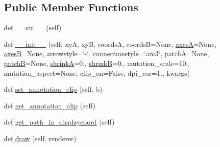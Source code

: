 \subsection*{Public Member Functions}
\begin{DoxyCompactItemize}
\item 
def \hyperlink{classmatplotlib_1_1patches_1_1ConnectionPatch_a54f8ca8cd2c025488440c8a673471175}{\+\_\+\+\_\+str\+\_\+\+\_\+} (self)
\item 
def \hyperlink{classmatplotlib_1_1patches_1_1ConnectionPatch_a6f4e5dce65fbbb4796e7a4d33cdf638d}{\+\_\+\+\_\+init\+\_\+\+\_\+} (self, xyA, xyB, coordsA, coordsB=None, \hyperlink{classmatplotlib_1_1patches_1_1ConnectionPatch_a5943bba0396030581a92ed5f92fcf5ff}{axesA}=None, \hyperlink{classmatplotlib_1_1patches_1_1ConnectionPatch_a7c33301ad97b65e7bdc1cad339ff071f}{axesB}=None, arrowstyle=\char`\"{}-\/\char`\"{}, connectionstyle=\char`\"{}arc3\char`\"{}, patchA=None, \hyperlink{classmatplotlib_1_1patches_1_1FancyArrowPatch_a9cc415418cb63ac92789d825f6807e1e}{patchB}=None, \hyperlink{classmatplotlib_1_1patches_1_1FancyArrowPatch_adfb328e84a682e61d16ab31c90bb0290}{shrinkA}=0., \hyperlink{classmatplotlib_1_1patches_1_1FancyArrowPatch_a54e1943557952ab7abc9be952291556e}{shrinkB}=0., mutation\+\_\+scale=10., mutation\+\_\+aspect=None, clip\+\_\+on=False, dpi\+\_\+cor=1., kwargs)
\item 
def \hyperlink{classmatplotlib_1_1patches_1_1ConnectionPatch_a4af9603311758d785201f900298621a3}{set\+\_\+annotation\+\_\+clip} (self, b)
\item 
def \hyperlink{classmatplotlib_1_1patches_1_1ConnectionPatch_a3ca72ece332fa3d399240f7dcfbc15a3}{get\+\_\+annotation\+\_\+clip} (self)
\item 
def \hyperlink{classmatplotlib_1_1patches_1_1ConnectionPatch_ae336323c302865df6d97c3fbafa9e3cd}{get\+\_\+path\+\_\+in\+\_\+displaycoord} (self)
\item 
def \hyperlink{classmatplotlib_1_1patches_1_1ConnectionPatch_a33cdbebec3df9036458f8a08f7de5c5f}{draw} (self, renderer)
\end{DoxyCompactItemize}
